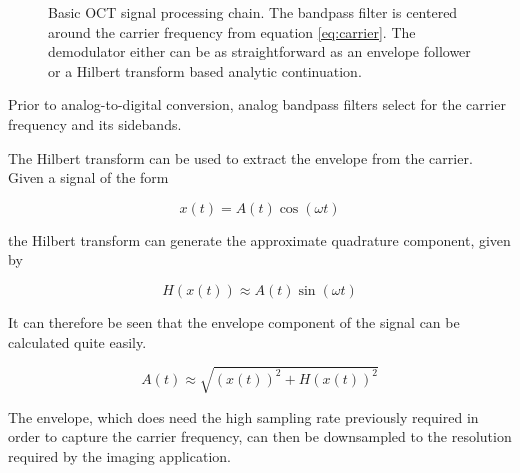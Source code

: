 
\begin{figure}[h!]
  \centering
{}
\caption{Basic OCT signal processing chain. The bandpass filter is centered around the carrier frequency from equation \ref{eq:carrier}. The demodulator either can be as straightforward as an envelope follower or a Hilbert transform based analytic continuation.}
\end{figure}

Prior to analog-to-digital conversion, analog bandpass filters select for the carrier frequency and its sidebands.

The Hilbert transform can be used to extract the envelope from the carrier. Given a signal of the form

\begin{equation}
x(t) = A(t)\cos{(\omega t)}
\end{equation}

the Hilbert transform can generate the approximate quadrature component, given by

\begin{equation}
H(x(t)) \approx A(t) \sin{(\omega t)}
\end{equation}

It can therefore be seen that the envelope component of the signal can be calculated quite easily. \cite{oppenheim}

\begin{equation}
A(t) \approx \sqrt{(x(t))^2 + H(x(t))^2}
\end{equation}

The envelope, which does need the high sampling rate previously required in order to capture the carrier frequency, can then be downsampled to the resolution required by the imaging application.

